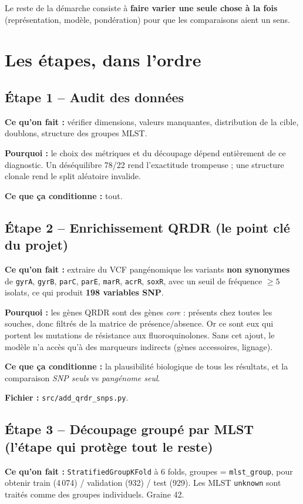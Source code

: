 \documentclass[11pt,a4paper]{article}
\begin{document}
Le reste de la démarche consiste à \textbf{faire varier une seule chose à la fois} (représentation, modèle, pondération) pour que les comparaisons aient un sens.

\section{Les étapes, dans l'ordre}

\subsection{Étape 1 -- Audit des données}
\textbf{Ce qu'on fait :} vérifier dimensions, valeurs manquantes, distribution de la cible, doublons, structure des groupes MLST.

\textbf{Pourquoi :} le choix des métriques et du découpage dépend entièrement de ce diagnostic. Un déséquilibre 78/22 rend l'exactitude trompeuse ; une structure clonale rend le split aléatoire invalide.

\textbf{Ce que ça conditionne :} tout.

\subsection{Étape 2 -- Enrichissement QRDR (le point clé du projet)}
\textbf{Ce qu'on fait :} extraire du VCF pangénomique les variants \textbf{non synonymes} de \texttt{gyrA}, \texttt{gyrB}, \texttt{parC}, \texttt{parE}, \texttt{marR}, \texttt{acrR}, \texttt{soxR}, avec un seuil de fréquence $\geq 5$ isolats, ce qui produit \textbf{198 variables SNP}.

\textbf{Pourquoi :} les gènes QRDR sont des gènes \emph{core} : présents chez toutes les souches, donc filtrés de la matrice de présence/absence. Or ce sont eux qui portent les mutations de résistance aux fluoroquinolones. Sans cet ajout, le modèle n'a accès qu'à des marqueurs indirects (gènes accessoires, lignage).

\textbf{Ce que ça conditionne :} la plausibilité biologique de tous les résultats, et la comparaison \emph{SNP seuls} vs \emph{pangénome seul}.

\textbf{Fichier :} \texttt{src/add\_qrdr\_snps.py}.

\subsection{Étape 3 -- Découpage groupé par MLST (l'étape qui protège tout le reste)}
\textbf{Ce qu'on fait :} \texttt{StratifiedGroupKFold} à 6 folds, groupes = \texttt{mlst\_group}, pour obtenir train (4\,074) / validation (932) / test (929). Les MLST \texttt{unknown} sont traités comme des groupes individuels. Graine 42.
\end{document}
